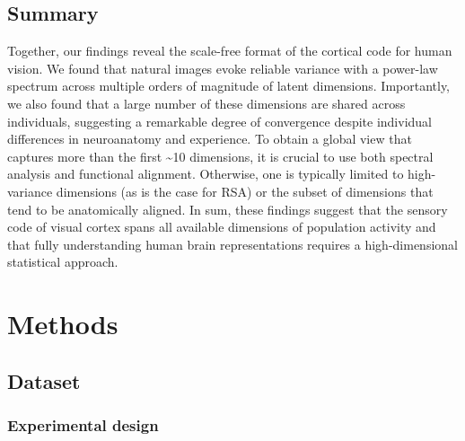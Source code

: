 \documentclass[10pt]{article}
\begin{document}
\subsection{Summary}\label{summary}

Together, our findings reveal the scale-free format of the cortical code for human vision. We found that natural images evoke reliable variance with a power-law spectrum across multiple orders of magnitude of latent dimensions. Importantly, we also found that a large number of these dimensions are shared across individuals, suggesting a remarkable degree of convergence despite individual differences in neuroanatomy and experience. To obtain a global view that captures more than the first \textasciitilde10 dimensions, it is crucial to use both spectral analysis and functional alignment. Otherwise, one is typically limited to high-variance dimensions (as is the case for RSA) or the subset of dimensions that tend to be anatomically aligned. In sum, these findings suggest that the sensory code of visual cortex spans all available dimensions of population activity and that fully understanding human brain representations requires a high-dimensional statistical approach.

\section{Methods}\label{methods}

\subsection{Dataset}\label{dataset}

\subsubsection{Experimental design}\label{experimental-design}
\end{document}
